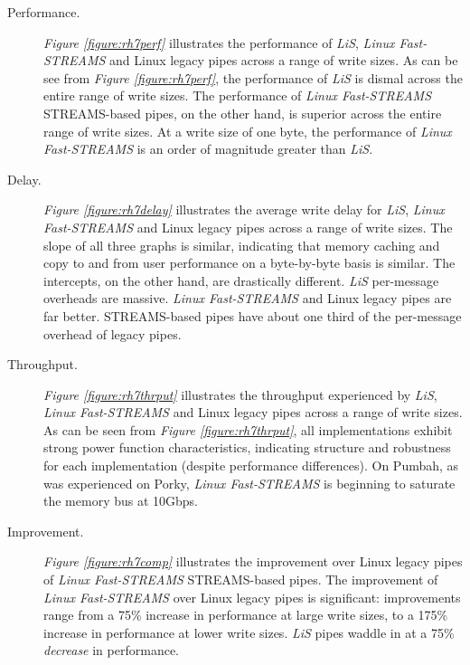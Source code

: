 \documentclass[letterpaper,final,notitlepage,twocolumn,10pt,twoside]{article}
\begin{document}
\begin{description}

\item[Performance.]

\textit{Figure \ref{figure:rh7perf}}
illustrates the performance of \textsl{LiS}, \textsl{Linux Fast-STREAMS} and Linux legacy pipes
across a range of write sizes.  As can be see from \textit{Figure \ref{figure:rh7perf}}, the
performance of \textsl{LiS} is dismal across the entire range of write sizes.  The performance of
\textsl{Linux Fast-STREAMS} STREAMS-based pipes, on the other hand, is superior across the entire
range of write sizes.  At a write size of one byte, the performance of \textsl{Linux Fast-STREAMS}
is an order of magnitude greater than \textsl{LiS}.

\item[Delay.]

\textit{Figure \ref{figure:rh7delay}}
illustrates the average write delay for \textsl{LiS}, \textsl{Linux Fast-STREAMS} and Linux legacy
pipes across a range of write sizes.  The slope of all three graphs is similar, indicating that
memory caching and copy to and from user performance on a byte-by-byte basis is similar.  The
intercepts, on the other hand, are drastically different.  \textsl{LiS} per-message overheads are
massive.  \textsl{Linux Fast-STREAMS} and Linux legacy pipes are far better.  STREAMS-based pipes
have about one third of the per-message overhead of legacy pipes.

\item[Throughput.]

\textit{Figure \ref{figure:rh7thrput}}
illustrates the throughput experienced by \textsl{LiS}, \textsl{Linux Fast-STREAMS} and Linux legacy
pipes across a range of write sizes.  As can be seen from \textit{Figure \ref{figure:rh7thrput}},
all implementations exhibit strong power function characteristics, indicating structure and
robustness for each implementation (despite performance differences).  On Pumbah, as was experienced
on Porky, \textsl{Linux Fast-STREAMS} is beginning to saturate the memory bus at 10Gbps.

\item[Improvement.]

\textit{Figure \ref{figure:rh7comp}}
illustrates the improvement over Linux legacy pipes of \textsl{Linux Fast-STREAMS} STREAMS-based
pipes.  The improvement of \textsl{Linux Fast-STREAMS} over Linux legacy pipes is significant:
improvements range from a 75\% increase in performance at large write sizes, to a 175\% increase in
performance at lower write sizes.  \textsl{LiS} pipes waddle in at a 75\% {\em decrease} in
performance.

\end{description}
\end{document}
